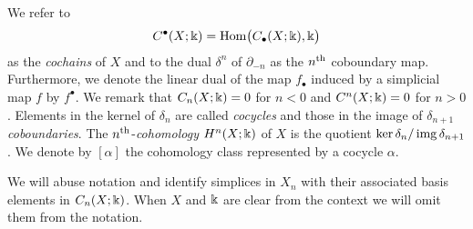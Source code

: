 We refer to
\begin{equation*}
C^\bullet(X; \Bbbk) = \mathrm{Hom} \big( C_\bullet(X; \Bbbk), \Bbbk \big)
\end{equation*}
as the \textit{cochains} of $X$ and to the dual $\delta^{n}$ of $\partial_{-n}$ as the $n^{\mathrm{th}}$ coboundary map.
Furthermore, we denote the linear dual of the map $f_\bullet$ induced by a simplicial map $f$ by $f^\bullet$.
We remark that $C_n(X; \Bbbk) = 0$ for $n < 0$ and $C^n(X;\Bbbk) = 0$ for $n > 0$.
Elements in the kernel of $\delta_n$ are called \textit{cocycles} and those in the image of $\delta_{n+1}$ \textit{coboundaries}.
The $n^{\mathrm{th}}$-\textit{cohomology} $H^n(X; \Bbbk)$ of $X$ is the quotient $\ker \delta_n / \operatorname{img} \delta_{n+1}$.
We denote by $[\alpha]$ the cohomology class represented by a cocycle $\alpha$.

We will abuse notation and identify simplices in $X_n$ with their associated basis elements in $C_{n}(X; \Bbbk)$.
When $X$ and $\Bbbk$ are clear from the context we will omit them from the notation.